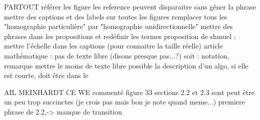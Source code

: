 PARTOUT
	référer les figure
	les reference peuvent disparaitre sans gêner la phrase
	mettre des captions et des labels sur toutes les figures
	remplacer tous les "homographie particulière" par "homographie unidirectionnelle"
	mettre des phrases dans les propositions et redéfinir les termes
	proposition de shmuel : mettre l'échelle dans les captions (pour connaitre la taille réelle)
	article mathématique : pas de texte libre (disons presque pas...?)
		soit : notation, remarque
	mettre le moins de texte libre possible
	la description d'un algo, si elle est courte, doit être dans le \caption


MAIL MEINHARDT CE WE
	commenté figure 33
	sections 2.2 et 2.3 sont peut être un peu trop succinctes (je crois pas mais bon je note quand meme...) 
	premiere phrase de 2.2,-> manque de transition
